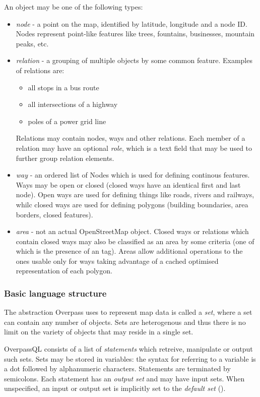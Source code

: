 \documentclass[main.tex]{subfiles}
\begin{document}
An object may be one of the following types:
\begin{itemize}
    \item \emph{node} - a point on the map, identified by latitude, longitude
        and a node ID. Nodes represent point-like features like trees, fountains,
        businesses, mountain peaks, etc.
    \item \emph{relation} - a grouping of multiple objects by some common
        feature. Examples of relations are:
        \begin{itemize}
            \item all stops in a bus route
            \item all intersections of a highway
            \item poles of a power grid line
        \end{itemize}
        Relations may contain nodes, ways and other relations. Each member of
        a relation may have an optional \emph{role}, which is a text field
        that may be used to further group relation elements.
    \item \emph{way} - an ordered list of Nodes which is used for defining
        continous features. Ways may be open or closed (closed ways have an
        identical first and last node). Open ways are used for defining things
        like roads, rivers and railways, whilc closed ways are used for defining
        polygons (building boundaries, area borders, closed features).
    \item \emph{area} - not an actual OpenStreetMap object. Closed ways or relations
        which contain closed ways may also be classified as an area by some
        criteria (one of which is the presence of an  tag).
        Areas allow additional operations to the ones usable only for ways
        taking advantage of a cached optimised representation of each polygon.
\end{itemize}

\subsubsection{Basic language structure}
The abstraction Overpass uses to represent map data is called a \emph{set},
where a set can contain any number of objects. Sets are heterogenous and thus
there is no limit on the variety of objects that may reside in a single set.

OverpassQL consists of a list of \emph{statements} which retreive, manipulate
or output such sets. Sets may be stored in variables: the syntax for referring
to a variable is a dot followed by alphanumeric characters.
Statements are terminated by semicolons.
Each statement has an \emph{output set} and may have input sets. When unspecified,
an input or output set is implicitly set to the \emph{default set} ().
\end{document}
